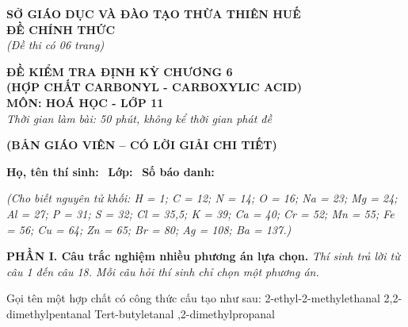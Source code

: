 \documentclass[12pt,a4paper]{article}
\begin{document}
\thispagestyle{firstpage}

\noindent
\begin{minipage}[t]{0.44\textwidth}
	\centering\fontsize{10pt}{12pt}\selectfont
	\textbf{SỞ GIÁO DỤC VÀ ĐÀO TẠO THỪA THIÊN HUẾ}\\
	\textbf{ĐỀ CHÍNH THỨC}\\
	\textit{(Đề thi có 06 trang)}
\end{minipage}\hfill
\begin{minipage}[t]{0.54\textwidth}
	\centering\fontsize{10.5pt}{13pt}\selectfont
	\textbf{ĐỀ KIỂM TRA ĐỊNH KỲ CHƯƠNG 6}\\
	\textbf{(HỢP CHẤT CARBONYL - CARBOXYLIC ACID)}\\
	\textbf{MÔN: HOÁ HỌC - LỚP 11}\\
	\textit{Thời gian làm bài: 50 phút, không kể thời gian phát đề}
	
	\smallskip
\end{minipage}

\smallskip
\begin{center}
	{\color{hfRed}\textbf{\large (BẢN GIÁO VIÊN -- CÓ LỜI GIẢI CHI TIẾT)}}
\end{center}

\smallskip
\noindent\hrulefill
\smallskip

\noindent\textbf{Họ, tên thí sinh:} \dotfill\ \textbf{Lớp:} \dotfill\ \textbf{Số báo danh:} \dotfill

\smallskip
\noindent\textit{(Cho biết nguyên tử khối: H = 1; C = 12; N = 14; O = 16; Na = 23; Mg = 24; Al = 27; P = 31; S = 32; Cl = 35,5; K = 39; Ca = 40; Cr = 52; Mn = 55; Fe = 56; Cu = 64; Zn = 65; Br = 80; Ag = 108; Ba = 137.)}

\smallskip
\noindent\textbf{\large PHẦN I. Câu trắc nghiệm nhiều phương án lựa chọn.}
\textit{Thí sinh trả lời từ câu 1 đến câu 18. Mỗi câu hỏi thí sinh chỉ chọn một phương án.}
\vspace{0.2cm}

\begin{ex}
Gọi tên một hợp chất có công thức cấu tạo như sau: 
\choice
{2-ethyl-2-methylethanal}
{2,2-dimethylpentanal}
{Tert-butyletanal}
{,2-dimethylpropanal}

\end{ex}
\end{document}
